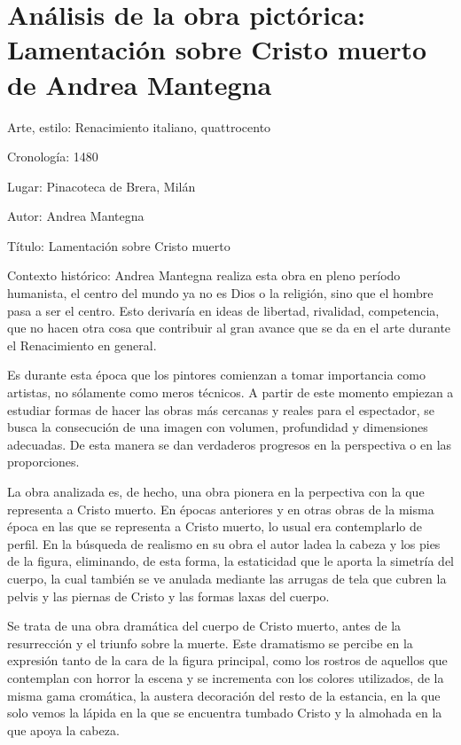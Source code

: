 \section{Análisis de la obra pictórica: Lamentación sobre Cristo muerto de Andrea Mantegna}

Arte, estilo: Renacimiento italiano, quattrocento

Cronología: 1480

Lugar: Pinacoteca de Brera, Milán

Autor: Andrea Mantegna

Título: Lamentación sobre Cristo muerto


Contexto histórico: Andrea Mantegna realiza esta obra en pleno período humanista, el centro del mundo ya no es Dios o la religión, sino que el hombre pasa a ser el centro. Esto derivaría en ideas de libertad, rivalidad, competencia, que no hacen otra cosa que contribuir al gran avance que se da en el arte durante el Renacimiento en general.

Es durante esta época que los pintores comienzan a tomar importancia como artistas, no sólamente como meros técnicos. A partir de este momento empiezan a estudiar formas de hacer las obras más cercanas y reales para el espectador, se busca la consecución de una imagen con volumen, profundidad y dimensiones adecuadas. De esta manera se dan verdaderos progresos en la perspectiva o en las proporciones.

La obra analizada es, de hecho, una obra pionera en la perpectiva con la que representa a Cristo muerto. En épocas anteriores y en otras obras de la misma época en las que se representa a Cristo muerto, lo usual era contemplarlo de perfil. En la búsqueda de realismo en su obra el autor ladea la cabeza y los pies de la figura, eliminando, de esta forma, la estaticidad que le aporta la simetría del cuerpo, la cual también se ve anulada mediante las arrugas de tela que cubren la pelvis y las piernas de Cristo y las formas laxas del cuerpo.

Se trata de una obra dramática del cuerpo de Cristo muerto, antes de la resurrección y el triunfo sobre la muerte. Este dramatismo se percibe en la expresión tanto de la cara de la figura principal, como los rostros de aquellos que contemplan con horror la escena y se incrementa con los colores utilizados, de la misma gama cromática, la austera decoración del resto de la estancia, en la que solo vemos la lápida en la que se encuentra tumbado Cristo y la almohada en la que apoya la cabeza.

